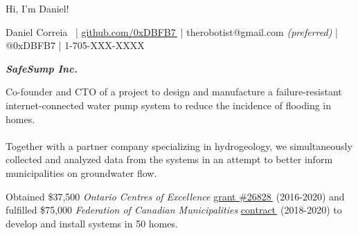 \documentclass[fleqn,11pt]{article}
\newcommand{\ressection}[1]{\textbf{{\Large \textit{#1}}}\xrfill[0.1ex]{0.6pt}}
\begin{document}
%
%
%
%
%
%
%
%
%
%
%
%


\begingroup
{}\selectfont

{\Huge Hi, I'm Daniel!}

\endgroup


\begin{center}
\small{{Daniel Correia}\  
	\let\orighref\href%
	\renewcommand{\href}[2]{\orighref{#1}{#2\,{\footnotesize{\faExternalLink}}}}
	| \href{https://github.com/0xDBFB7}{github.com/0xDBFB7} | therobotist@gmail.com \textit{(preferred)} | @0xDBFB7 | 1-705-XXX-XXXX}\\
\end{center}

\let\orighref\href%
\renewcommand{\href}[2]{\orighref{#1}{#2\,{\footnotesize{\faExternalLink}}}}


\ressection{SafeSump Inc.}

Co-founder and CTO of a project to design and manufacture a failure-resistant internet-connected water pump system to reduce the incidence of flooding in homes.\\\\ Together with a partner company specializing in hydrogeology, we simultaneously collected and analyzed data from the systems in an attempt to better inform municipalities on groundwater flow.%

Obtained \$37,500 \textit{Ontario Centres of Excellence} \href{https://drive.google.com/file/d/1WXrxVwTggaL7WEvLv6DgJ891fSo7LqqP/view?usp=sharing}{grant \#26828} (2016-2020) and fulfilled \$75,000 \textit{Federation of Canadian Municipalities} \href{https://drive.google.com/file/d/11pdJNzYDE-28X3m0rH8mE4cxoliTJZGH/view?usp=sharing}{contract} (2018-2020) to develop and install systems in 50 homes.
\end{document}
